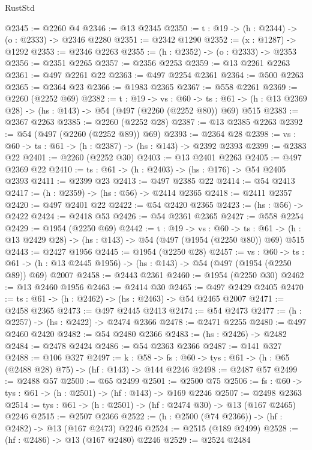 \begin{lexlean}{RustStd}
\begin{coremodule}
@2345 := @2260 @4
@2346 := @13 @2345
@2350 := {t : @19} -> (h : @2344) -> (o : @2333) -> @2346 @2280
@2351 := @2342 @1290
@2352 := (x : @1287) -> @1292
@2353 := @2346 @2263
@2355 := (h : @2352) -> (o : @2333) -> @2353
@2356 := @2351 @2265
@2357 := @2356 @2253
@2359 := @13 @2261 @2263
@2361 := @497 @2261 @22
@2363 := @497 @2254 @2361
@2364 := @500 @2263
@2365 := @2364 @23
@2366 := @1983 @2365
@2367 := @558 @2261
@2369 := @2260 (@2252 @69)
@2382 := {t : @19} ->
  {vs : @60} ->
  {ts : @61} -> (h : @13 @2369 @28) -> (hs : @143) -> @54 (@497 (@2260 (@2252 @80)) @69) @515
@2383 := @2367 @2263
@2385 := @2260 (@2252 @28)
@2387 := @13 @2385 @2263
@2392 := @54 (@497 (@2260 (@2252 @89)) @69)
@2393 := @2364 @28
@2398 := {vs : @60} -> {ts : @61} -> (h : @2387) -> (hs : @143) -> @2392 @2393
@2399 := @2383 @22
@2401 := @2260 (@2252 @30)
@2403 := @13 @2401 @2263
@2405 := @497 @2369 @22
@2410 := {ts : @61} -> (h : @2403) -> (hs : @176) -> @54 @2405 @2393
@2411 := @2399 @23
@2413 := @497 @2385 @22
@2414 := @54 @2413
@2417 := (h : @2359) -> (hs : @56) -> @2414 @2365
@2418 := @2411 @2357
@2420 := @497 @2401 @22
@2422 := @54 @2420 @2365
@2423 := (hs : @56) -> @2422
@2424 := @2418 @53
@2426 := @54 @2361 @2365
@2427 := @558 @2254
@2429 := @1954 (@2250 @69)
@2442 := {t : @19} ->
  {vs : @60} ->
  {ts : @61} -> (h : @13 @2429 @28) -> (hs : @143) -> @54 (@497 (@1954 (@2250 @80)) @69) @515
@2443 := @2427 @1956
@2445 := @1954 (@2250 @28)
@2457 := {vs : @60} ->
  {ts : @61} -> (h : @13 @2445 @1956) -> (hs : @143) -> @54 (@497 (@1954 (@2250 @89)) @69) @2007
@2458 := @2443 @2361
@2460 := @1954 (@2250 @30)
@2462 := @13 @2460 @1956
@2463 := @2414 @30
@2465 := @497 @2429 @2405
@2470 := {ts : @61} -> (h : @2462) -> (hs : @2463) -> @54 @2465 @2007
@2471 := @2458 @2365
@2473 := @497 @2445 @2413
@2474 := @54 @2473
@2477 := (h : @2257) -> (hs : @2422) -> @2474 @2366
@2478 := @2471 @2255
@2480 := @497 @2460 @2420
@2482 := @54 @2480 @2366
@2483 := (hs : @2426) -> @2482
@2484 := @2478 @2424
@2486 := @54 @2363 @2366
@2487 := @141 @327
@2488 := @106 @327
@2497 := {k : @58} ->
  {fs : @60} -> {tys : @61} -> (h : @65 (@2488 @28) @75) -> (hf : @143) -> @144 @2246
@2498 := @2487 @57
@2499 := @2488 @57
@2500 := @65 @2499
@2501 := @2500 @75
@2506 := {fs : @60} -> {tys : @61} -> (h : @2501) -> (hf : @143) -> @169 @2246
@2507 := @2498 @2363
@2514 := {tys : @61} -> (h : @2501) -> (hf : @2474 @30) -> @13 (@167 @2465) @2246
@2515 := @2507 @2366
@2522 := (h : @2500 (@74 @2366)) -> (hf : @2482) -> @13 (@167 @2473) @2246
@2524 := @2515 (@189 @2499)
@2528 := (hf : @2486) -> @13 (@167 @2480) @2246
@2529 := @2524 @2484

\end{coremodule}
\end{lexlean}
